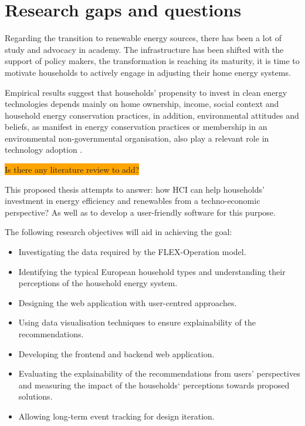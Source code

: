 \section{Research gaps and questions}


Regarding the transition to renewable energy sources, 
there has been a lot of study and advocacy in academy. 
The infrastructure has been shifted with the support of policy makers, 
the transformation is reaching its maturity, 
it is time to motivate households to actively engage in adjusting their home energy systems.

Empirical results suggest that households' propensity to invest in clean energy technologies depends mainly on home ownership, income, social context and household energy conservation practices,
in addition, environmental attitudes and beliefs, as manifest in energy conservation practices or membership in an environmental non-governmental organisation, also play a relevant role in technology adoption \cite{determinants}.

\colorbox{orange}{Is there any literature review to add?}

This proposed thesis attempts to answer:  
how HCI can help households' investment in energy efficiency and renewables
from a techno-economic perspective? 
As well as to develop a user-friendly software for this purpose. 

The following research objectives will aid in achieving the goal: 

\begin{itemize}
  \item Investigating the data required by the FLEX-Operation model. 
  \item Identifying the typical European household types and understanding their perceptions of the household energy system. 
  \item Designing the web application with user-centred approaches. 
  \item Using data visualisation techniques to ensure explainability of the recommendations. 
  \item Developing the frontend and backend web application. 
  \item Evaluating the explainability of the recommendations from users' perspectives and measuring the impact of the households‘ perceptions towards proposed solutions. 
  \item Allowing long-term event tracking for design iteration. 
\end{itemize}


